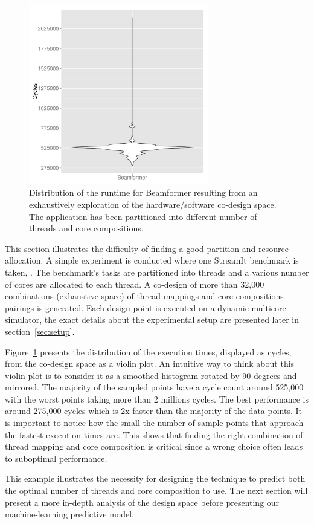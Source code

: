 \begin{figure}[h]
    \centering
    \includegraphics[width=0.7\textwidth]{streamit-paper/graphics/beamformer_motivation.pdf}
    \caption{Distribution of the runtime for Beamformer resulting from an exhaustively exploration of the hardware/software co-design space.
     The application has been partitioned into different number of threads and core compositions.}
     \label{fig:beamformermotiv}
\end{figure}

This section illustrates the difficulty of finding a good partition and resource allocation.
A simple experiment is conducted where one StreamIt benchmark is taken, .
The benchmark's tasks are partitioned into threads and a various number of cores are allocated to each thread.
A co-design of more than 32,000 combinations (exhaustive space) of thread mappings and core compositions pairings is generated.
Each design point is executed on a dynamic multicore simulator, the exact details about the experimental setup are presented later in section~\ref{sec:setup}.

Figure~\ref{fig:beamformermotiv} presents the distribution of the execution times, displayed as cycles, from the co-design space as a violin plot.
An intuitive way to think about this violin plot is to consider it as a smoothed histogram rotated by 90 degrees and mirrored.
The majority of the sampled points have a cycle count around 525,000 with the worst points taking more than 2 millions cycles.
The best performance is around 275,000 cycles which is 2x faster than the majority of the data points.
It is important to notice how the small the number of sample points that approach the fastest execution times are.
This shows that finding the right combination of thread mapping and core composition is critical since a wrong choice often leads to suboptimal performance.


This example illustrates the necessity for designing the technique to predict both the optimal number of threads and core composition to use.
The next section will present a more in-depth analysis of the design space before presenting our machine-learning predictive model.

